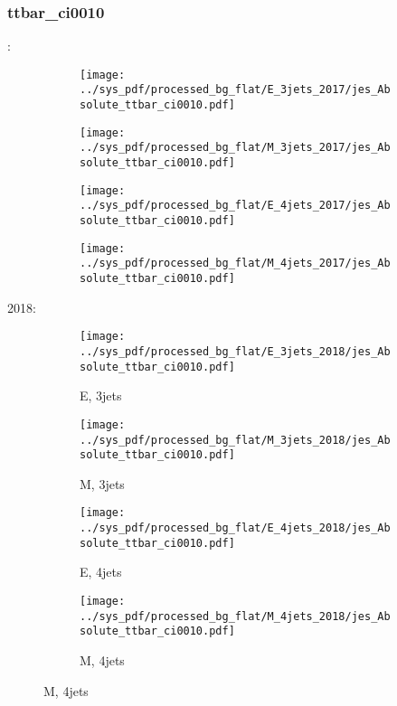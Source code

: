 \documentclass{beamer}
\begin{document}
\begin{frame}
\frametitle{ttbar_ci0010}
\fontsize{5}{1}:
\begin{figure}
\centering
\begin{subfigure}[b]{0.24\textwidth}
\texttt{[image: ../sys\_pdf/processed\_bg\_flat/E\_3jets\_2017/jes\_Absolute\_ttbar\_ci0010.pdf]}
\end{subfigure}
\begin{subfigure}[b]{0.24\textwidth}
\texttt{[image: ../sys\_pdf/processed\_bg\_flat/M\_3jets\_2017/jes\_Absolute\_ttbar\_ci0010.pdf]}
\end{subfigure}
\begin{subfigure}[b]{0.24\textwidth}
\texttt{[image: ../sys\_pdf/processed\_bg\_flat/E\_4jets\_2017/jes\_Absolute\_ttbar\_ci0010.pdf]}
\end{subfigure}
\begin{subfigure}[b]{0.24\textwidth}
\texttt{[image: ../sys\_pdf/processed\_bg\_flat/M\_4jets\_2017/jes\_Absolute\_ttbar\_ci0010.pdf]}
\end{subfigure}
\end{figure}
2018:
\begin{figure}
\centering
\begin{subfigure}[b]{0.24\textwidth}
\texttt{[image: ../sys\_pdf/processed\_bg\_flat/E\_3jets\_2018/jes\_Absolute\_ttbar\_ci0010.pdf]}
\captionsetup{font=tiny}
\caption{E, 3jets}
\end{subfigure}
\begin{subfigure}[b]{0.24\textwidth}
\texttt{[image: ../sys\_pdf/processed\_bg\_flat/M\_3jets\_2018/jes\_Absolute\_ttbar\_ci0010.pdf]}
\captionsetup{font=tiny}
\caption{M, 3jets}
\end{subfigure}
\begin{subfigure}[b]{0.24\textwidth}
\texttt{[image: ../sys\_pdf/processed\_bg\_flat/E\_4jets\_2018/jes\_Absolute\_ttbar\_ci0010.pdf]}
\captionsetup{font=tiny}
\caption{E, 4jets}
\end{subfigure}
\begin{subfigure}[b]{0.24\textwidth}
\texttt{[image: ../sys\_pdf/processed\_bg\_flat/M\_4jets\_2018/jes\_Absolute\_ttbar\_ci0010.pdf]}
\captionsetup{font=tiny}
\caption{M, 4jets}
\end{subfigure}
\end{figure}
\end{frame}
\end{document}

